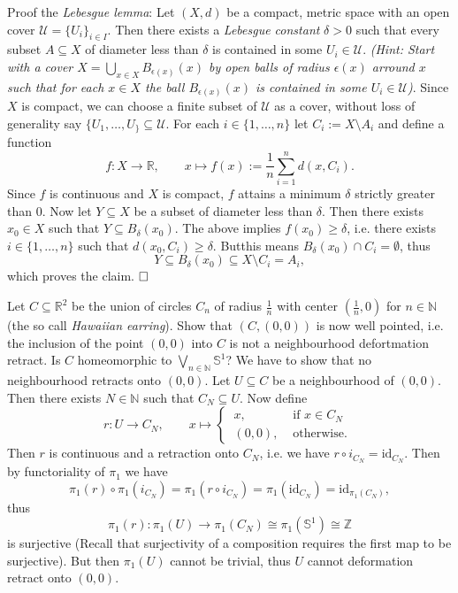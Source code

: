 \documentclass[11pt]{book}
\numberwithin{dummy}{section}
\theoremstyle{nonumberbreak}
\newenvironment{sol}[1][]{\ifthenelse{\equal{#1}{}}{\solution}{\solution[#1]}\rm}{\endsolution}
\newenvironment{prob}[1][]{\ifthenelse{\equal{#1}{}}{\problem}{\problem[#1]}\rm}{\endproblem}
\newcommand{\Sph}{\mathbb{S}}
\newcommand{\la}{\longrightarrow}
\newcommand{\id}{\mathrm{id}}
\newcommand{\Z}{\mathbb{Z}}
\begin{document}
\begin{spacing}{1.4}
\begin{prob} %
Proof the \textit{Lebesgue lemma}: Let $(X,d)$ be a compact, metric space with an open cover $\mathcal{U}=\{U_i \}_{i\in I}$. Then there exists a \textit{Lebesgue constant} $\delta >0$ such that every subset $A \subseteq X$ of diameter less than $\delta$ is contained in some $U_i \in \mathcal{U}$. \textit{(Hint: Start with a cover $X= \bigcup_{x \in X}B_{\epsilon(x)}(x)$ by open balls of radius $\epsilon(x)$ arround $x$ such that for each $x \in X$ the ball $B_{\epsilon(x)}(x)$ is contained in some $U_i \in \mathcal{U}$)}.
\begin{sol}
Since $X$ is compact, we can choose a finite subset of $\mathcal{U}$ as a cover, without loss of generality say $\{U_1, \ldots, U_\} \subseteq \mathcal{U}$. For each $i \in \{1, \ldots, n \}$ let $C_i:= X \setminus A_i$ and define a function 
$$f: X \la \mathbb{R}, \qquad x \mapsto f(x) := \frac{1}{n} \sum_{i=1}^n d(x,C_i).$$
Since $f$ is continuous and $X$ is compact, $f$ attains a minimum $\delta$ strictly greater than $0$. Now let $Y\subseteq X$ be a subset of diameter less than $\delta$. Then there exists $x_0 \in X$ such that $Y \subseteq B_{\delta}(x_0)$. The above implies $f(x_0) \geqslant \delta$, i.e. there exists $i \in \{1, \ldots, n \}$ such that $d(x_0, C_i) \geqslant \delta$. Butthis means $B_{\delta}(x_0) \cap C_i = \emptyset$, thus $$Y\subseteq B_{\delta}(x_0) \subseteq X \setminus C_i = A_i,$$
which proves the claim. $\hfill \Box$
\end{sol}
 
\end{prob}


\begin{prob}   %
Let $C \subseteq \mathbb{R}^2$ be the union of circles $C_n$ of radius $\frac{1}{n}$ with center $\left( \frac{1}{n},0\right)$ for $n \in \mathbb{N}$ (the so call \textit{Hawaiian earring}). Show that $(C,(0,0))$ is now well pointed, i.e. the inclusion of the point $(0,0)$ into $C$ is not a neighbourhood defortmation retract. Is $C$ homeomorphic to $\bigvee_{n \in \mathbb{N}} \Sph^1$?
\begin{sol}
We have to show that no neighbourhood retracts onto $(0,0)$. Let $U \subseteq C$ be a neighbourhood of $(0,0)$. Then there exists $N \in \mathbb{N}$ such that $C_N \subseteq U$. Now define
$$r: U \la C_N, \qquad x \mapsto \begin{cases} \ x, & \textrm{ if } x \in C_N \\ \ (0,0), & \textrm{ otherwise. } \end{cases}$$
Then $r$ is continuous and a retraction onto $C_N$, i.e. we have $r \circ i_{C_N} = \id_{C_N}$. Then by functoriality of $\pi_1$ we have
$$\pi_1(r) \circ \pi_1(i_{C_N}) = \pi_1( r \circ i_{C_N}) = \pi_1(\id_{C_N}) = \id_{\pi_1(C_N)},$$
thus 
$$\pi_1(r): \pi_1(U) \la \pi_1(C_N) \cong \pi_1(\Sph^1) \cong \Z$$
is surjective (Recall that surjectivity of a composition requires the first map to be surjective). But then $\pi_1(U)$ cannot be trivial, thus $U$ cannot deformation retract onto $(0,0)$. \\


\end{sol}
\end{prob}
\end{spacing}
\end{document}
